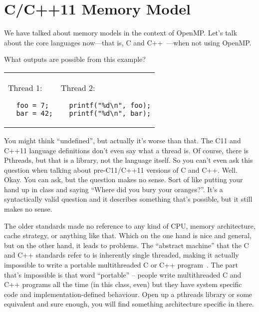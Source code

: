 




\section*{C/C++11 Memory Model}

We have talked about memory models in the context of OpenMP. Let's
talk about the core languages now---that is, C and C++~\cite{quora:cppthr, cppconcurrency}---when
not using OpenMP.

What outputs are possible from this example?

\begin{tabular}{ll}
      \begin{minipage}{.2\textwidth}
        Thread 1:
        \begin{verbatim}
  foo = 7;
  bar = 42;
        \end{verbatim}
      \end{minipage} &
      \begin{minipage}{.4\textwidth}
        Thread 2:
        \begin{verbatim}
  printf("%d\n", foo);
  printf("%d\n", bar);
        \end{verbatim}
      \end{minipage}
\end{tabular}

You might think ``undefined'', but actually it's worse than that. The 
C11 and C++11 language definitions don't even say what a thread is.
Of course, there is Pthreads, but that is a library, not the language itself.
So you can't even ask this question when talking about pre-C11/C++11 versions
of C and C++. Well. Okay. You can ask, but the question makes no sense. Sort of like
putting your hand up in class and saying ``Where did you bury your oranges?''.
It's a syntactically valid question and it describes something that's possible,
but it still makes no sense.

The older standards made no reference to any kind of CPU, memory architecture, cache
strategy, or anything like that. Which on the one hand is nice and general, but on the other hand, it leads to problems. The ``abstract machine'' that the C and C++ standards refer to is inherently single threaded, making it actually impossible to write a portable multithreaded C or C++ program~\cite{quora:cppthr}. The part that's impossible is that word ``portable'' -- people write multithreaded C and C++ programs all the time (in this class, even) but they have system specific code and implementation-defined behaviour. Open up a pthreads library or some equivalent and sure enough, you will find something architecture specific in there.

